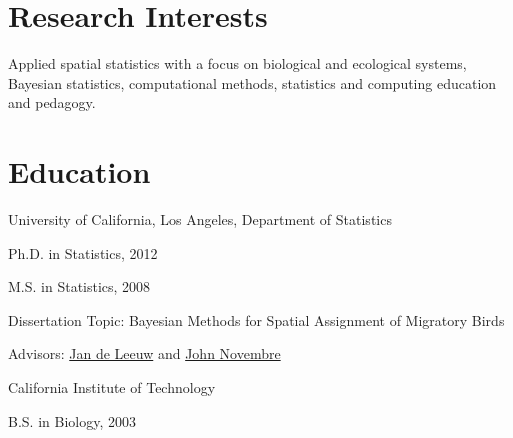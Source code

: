 \documentclass[margin,line]{res}
\begin{document}
\address{{\small 204 Old Chemistry Building $\bullet$ Department of Statistical Science, Duke University $\bullet$  Durham, NC 27708-0251}}
\address{{\small (310) 882-8854 $\bullet$ \href{mailto:rundel@gmail.com}{rundel@gmail.com} $\bullet$ \href{mailto:colin.rundel@stat.duke.edu}{colin.rundel@stat.duke.edu}}}


\begin{resume}

%

\vspace{3mm}

\section{\sc Research Interests}
Applied spatial statistics with a focus on biological and ecological systems, Bayesian statistics, computational methods, statistics and computing education and pedagogy.

\vspace{4mm}

%

\section{\sc Education}
University of California, Los Angeles, Department of Statistics
\vspace{1mm}
\begin{list1}
\item[] Ph.D. in Statistics,  2012
\item[] M.S. in Statistics,  2008
\vspace{1mm}
\item[] Dissertation Topic:  Bayesian Methods for Spatial Assignment of Migratory Birds
\item[] Advisors:  \href{http://www.cuddyvalley.org}{Jan de Leeuw} and \href{http://www.eeb.ucla.edu/Faculty/Novembre/}{John Novembre}
\end{list1}

\vspace{-0.13cm}
California Institute of Technology
\vspace{1mm}
\begin{list1}
\item[] B.S. in Biology, 2003
\end{list1}

\vspace{3mm}

%


\end{resume}
\end{document}
